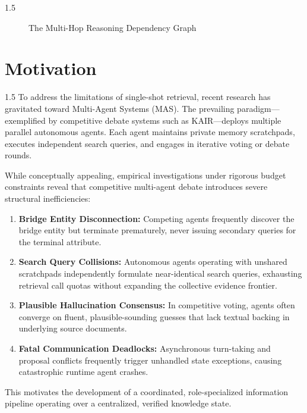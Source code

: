 \documentclass[12pt,a4paper]{report}
\begin{document}
\begin{spacing}{1.5}
\begin{figure}[!htbp]
\caption{The Multi-Hop Reasoning Dependency Graph}
\label{fig:multihop_graph}
\end{figure}
\end{spacing}

\section{Motivation}
\begin{spacing}{1.5}
To address the limitations of single-shot retrieval, recent research has gravitated toward Multi-Agent Systems (MAS). The prevailing paradigm—exemplified by competitive debate systems such as KAIR—deploys multiple parallel autonomous agents. Each agent maintains private memory scratchpads, executes independent search queries, and engages in iterative voting or debate rounds. 

While conceptually appealing, empirical investigations under rigorous budget constraints reveal that competitive multi-agent debate introduces severe structural inefficiencies:
\begin{enumerate}
    \item \textbf{Bridge Entity Disconnection:} Competing agents frequently discover the bridge entity but terminate prematurely, never issuing secondary queries for the terminal attribute.
    \item \textbf{Search Query Collisions:} Autonomous agents operating with unshared scratchpads independently formulate near-identical search queries, exhausting retrieval call quotas without expanding the collective evidence frontier.
    \item \textbf{Plausible Hallucination Consensus:} In competitive voting, agents often converge on fluent, plausible-sounding guesses that lack textual backing in underlying source documents.
    \item \textbf{Fatal Communication Deadlocks:} Asynchronous turn-taking and proposal conflicts frequently trigger unhandled state exceptions, causing catastrophic runtime agent crashes.
\end{enumerate}
This motivates the development of a coordinated, role-specialized information pipeline operating over a centralized, verified knowledge state.
\end{spacing}
\end{document}

